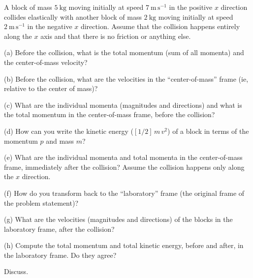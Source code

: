 \documentclass[12pt,letterpaper]{article}
\begin{document}
A block of mass $5~\mathrm{kg}$ moving initially at speed
$7~\mathrm{m\,s^{-1}}$ in the positive $x$ direction collides
elastically with another block of mass $2~\mathrm{kg}$ moving
initially at speed $2~\mathrm{m\,s^{-1}}$ in the negative $x$
direction.  Assume that the collision happens entirely along the $x$
axis and that there is no friction or anything else.

(a) Before the collision, what is the total momentum (sum of all
momenta) and the center-of-mass velocity?

\vfill

(b) Before the collision, what are the velocities in the
``center-of-mass'' frame (ie, relative to the center of mass)?

\vfill

(c) What are the individual momenta (magnitudes and directions) and
what is the total momentum in the center-of-mass frame, before the
collision?

\vfill

(d) How can you write the kinetic energy ($[1/2]\,m\,v^2$) of a block
in terms of the momentum $p$ and mass $m$?

\vfill

(e) What are the individual momenta and total momenta in the
center-of-mass frame, immediately after the collision?  Assume the
collision happens only along the $x$ direction.

\vfill

(f) How do you transform back to the ``laboratory'' frame (the
original frame of the problem statement)?

\vfill

(g) What are the velocities (magnitudes and directions) of the blocks
in the laboratory frame, after the collision?

\vfill

(h) Compute the total momentum and total kinetic energy, before and
after, in the laboratory frame.  Do they agree?

\vfill

Discuss.
\end{document}
